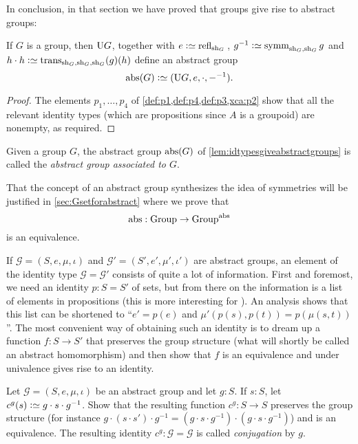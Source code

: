 In conclusion, in that section we have proved that groups give rise to
abstract groups:
  \begin{lemma}\label{lem:idtypesgiveabstractgroups}
    If $G$ is a group, then $\mathrm{U} G$, together with $e\defequi\refl{\sh_G}{}$, $g^{-1}\defequi\symm_{\sh_G,\sh_G}g$ and $h\cdot h\defequi\trans_{\sh_G,\sh_G,\sh_G}(g)(h)$
define an abstract group
$$\abstr(G)\defequi (\USym G,e,\cdot,{-}^{-1}).$$
  \end{lemma}
  \begin{proof}
    The elements $p_1,\dots, p_4$ of \cref{def:p1,def:p4,def:p3,xca:p2} show that all the relevant identity types (which are propositions since $A$ is a groupoid) are nonempty, as required.
  \end{proof}
  \begin{definition}\label{def:abstrG}
    Given a group $G$, the abstract group $\mathrm{abs}(G)$ of \cref{lem:idtypesgiveabstractgroups} is called the \emph{abstract group associated to $G$}.
  \end{definition}

 
\begin{remark}
  That the concept of an abstract group synthesizes the idea of symmetries will be justified in \cref{sec:Gsetforabstract} where we prove that 
$$\mathrm{abs}:\mathrm{Group}\to\mathrm{Group}^{\mathrm{abs}}$$
is an equivalence.
\end{remark}
\begin{remark}
  If $\mathcal G=(S,e,\mu,\iota)$ and $\mathcal G'=(S',e',\mu',\iota')$ are abstract groups, an element of the identity type $\mathcal G=\mathcal G'$ consists of quite a lot of information.  First and foremost, we need an identity $p:S=S'$ of sets, but from there on the information is a list of elements in propositions (this is more interesting for \inftygps).  An analysis shows that this list can be shortened to ``$e'=p(e)$ and $\mu'(p(s),p(t))=p(\mu(s,t))$''.  The most convenient way of obtaining such an identity is to dream up a function $f:S\to S'$ that preserves the group structure (\ie what will shortly be called an abstract homomorphism) and then show that $f$ is an equivalence and  under univalence gives rise to an identity.
\end{remark}
\begin{xca}
  \label{xca:conj}
  Let $\mathcal G=(S,e,\mu,\iota)$ be an abstract group and let $g:S$.  If $s:S$, let $c^g(s)\defequi g\cdot s\cdot g^{-1}$.  Show that the resulting function $c^g:S\to S$ preserves the group structure (for instance $g\cdot(s\cdot s')\cdot g^{-1}=(g\cdot s\cdot g^{-1} )\cdot(g\cdot s\cdot g^{-1})$) and is an equivalence.  The resulting identity $c^g:\mathcal G=\mathcal G$ is called \emph{conjugation} by $g$.
\end{xca}

